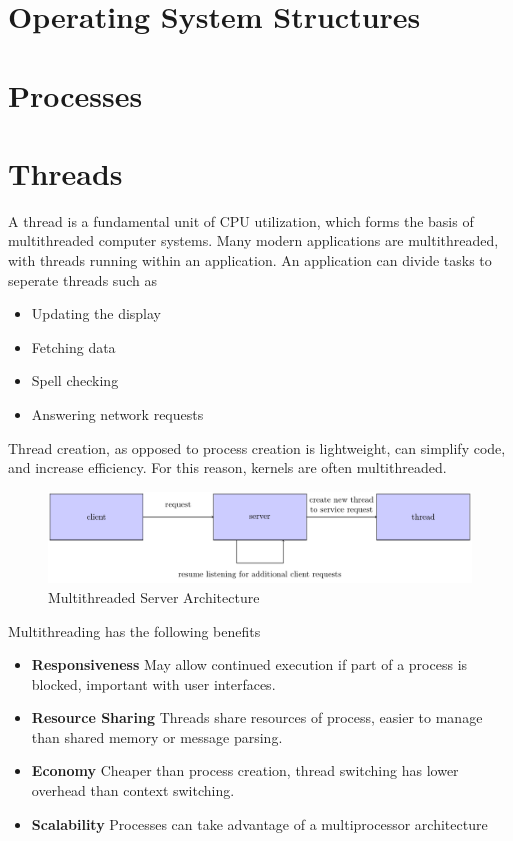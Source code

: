 \documentclass[oneside]{book}
\begin{document}
    \chapter{Operating System Structures}
    \chapter{Processes}
    \chapter{Threads}
            A thread is a fundamental unit of CPU utilization, which forms the basis of multithreaded computer systems.
            Many modern applications are multithreaded, with threads running within an application. An application can divide tasks to seperate threads
            such as
            \begin{itemize}
                \item Updating the display
                \item Fetching data
                \item Spell checking
                \item Answering network requests
            \end{itemize}
            Thread creation, as opposed to process creation is lightweight, can simplify code, and increase efficiency. For this reason, kernels are often
            multithreaded.
            \begin{figure}[H]
                \centering
                \includegraphics{figures/multithreader_server.pdf}
                \caption{Multithreaded Server Architecture}
            \end{figure}
            Multithreading has the following benefits
            \begin{itemize}
                \item \textbf{Responsiveness}
                    \subitem May allow continued execution if part of a process is blocked, important with user interfaces.
                \item \textbf{Resource Sharing}
                    \subitem Threads share resources of process, easier to manage than shared memory or message parsing.
                \item \textbf{Economy}
                    \subitem Cheaper than process creation, thread switching has lower overhead than context switching.
                \item \textbf{Scalability}
                    \subitem Processes can take advantage of a multiprocessor architecture
            \end{itemize}
\end{document}
